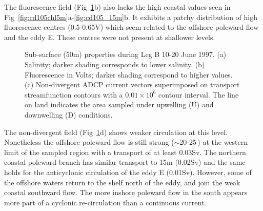 The fluorescence field (Fig~\ref{fig:cd105_51m}b) also lacks the
high coastal values seen in
Fig~\ref{fig:cd105chl5m}a-\ref{fig:cd105_15m}b. It exhibits a
patchy distribution of high fluorescence centres (0.5-0.65V) which
seem related to the offshore poleward flow and the eddy E. These
centres were not present at shallower levels.

\begin{figure}[ht]
\begin{widefig}{-.5cm}{-.7cm}
\centering {}%
 
\caption{Sub-surface (50m) properties during Leg B 10-20 June
1997. (a) Salinity; darker shading corresponds to lower salinity.
(b) Fluorescence in Volts; darker shading correspond to higher
values. (c) Non-divergent ADCP current vectors superimposed on
transport streamfunction contours with a $0.01\times 10^{6}$\tra
contour interval. The line on land indicates the area sampled
under upwelling (U) and downwelling (D) conditions.}
\label{fig:cd105_51m}%
\end{widefig}\end{figure}

The non-divergent field (Fig~\ref{fig:cd105_51m}d) shows weaker
circulation at this level. Nonetheless the offshore poleward flow
is still strong ($\sim$20-25\velc\,) at the western limit of the
sampled region with a transport of at least 0.03Sv. The northern
coastal poleward branch has similar transport to 15m (0.02Sv) and
the same holds for the anticyclonic circulation of the eddy E
(0.01Sv). However, some of the offshore waters return to the shelf
north of the eddy, and join the weak coastal southward flow. The
more inshore poleward flow in the south appears more part of a
cyclonic re-circulation than a continuous current.

